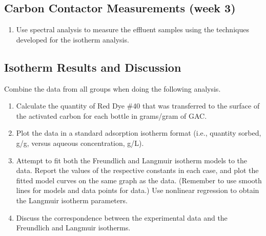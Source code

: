 \documentclass[letterpaper,10pt,english]{sphinxmanual}
\begin{document}
\subsection{Carbon Contactor Measurements (week 3)}
\label{\detokenize{Adsorption/Adsorption:carbon-contactor-measurements-week-3}}\begin{enumerate}
\item {} 
Use spectral analysis to measure the effluent samples using the techniques developed for the isotherm analysis.

\end{enumerate}


\subsection{Isotherm Results and Discussion}
\label{\detokenize{Adsorption/Adsorption:isotherm-results-and-discussion}}
Combine the data from all groups when doing the following analysis.
\begin{enumerate}
\item {} 
Calculate the quantity of Red Dye \#40 that was transferred to the surface of the activated carbon for each bottle in grams/gram of GAC.

\item {} 
Plot the data in a standard adsorption isotherm format (i.e., quantity sorbed, g/g, versus aqueous concentration, g/L).

\item {} 
Attempt to fit both the Freundlich and Langmuir isotherm models to the data. Report the values of the respective constants in each case, and plot the fitted model curves on the same graph as the data. (Remember to use smooth lines for models and data points for data.) Use nonlinear regression to obtain the Langmuir isotherm parameters.

\item {} 
Discuss the correspondence between the experimental data and the Freundlich and Langmuir isotherms.

\end{enumerate}
\end{document}
